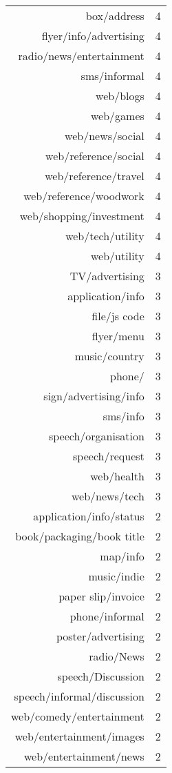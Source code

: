 \begin{table}[ht]
\begin{tabular}{rr}
  box/address &   4 \\ 
  flyer/info/advertising &   4 \\ 
  radio/news/entertainment &   4 \\ 
  sms/informal &   4 \\ 
  web/blogs &   4 \\ 
  web/games &   4 \\ 
  web/news/social &   4 \\ 
  web/reference/social &   4 \\ 
  web/reference/travel &   4 \\ 
  web/reference/woodwork &   4 \\ 
  web/shopping/investment &   4 \\ 
  web/tech/utility &   4 \\ 
  web/utility &   4 \\ 
  TV/advertising &   3 \\ 
  application/info &   3 \\ 
  file/js code &   3 \\ 
  flyer/menu &   3 \\ 
  music/country &   3 \\ 
  phone/ &   3 \\ 
  sign/advertising/info &   3 \\ 
  sms/info &   3 \\ 
  speech/organisation &   3 \\ 
  speech/request &   3 \\ 
  web/health &   3 \\ 
  web/news/tech &   3 \\ 
  application/info/status &   2 \\ 
  book/packaging/book title &   2 \\ 
  map/info &   2 \\ 
  music/indie &   2 \\ 
  paper slip/invoice &   2 \\ 
  phone/informal &   2 \\ 
  poster/advertising &   2 \\ 
  radio/News &   2 \\ 
  speech/Discussion &   2 \\ 
  speech/informal/discussion &   2 \\ 
  web/comedy/entertainment &   2 \\ 
  web/entertainment/images &   2 \\ 
  web/entertainment/news &   2 \\ 

\end{tabular}
\end{table}
